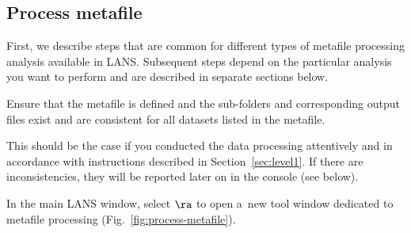
\subsection{Process metafile}
\setcounter{step}{0}

First, we describe steps that are common for different types of metafile processing analysis available in LANS. Subsequent steps depend on the particular analysis you want to perform and are described in separate sections below.

\s Ensure that the metafile is defined and the sub-folders and corresponding output files exist and are consistent for all datasets listed in the metafile.

\bul This should be the case if you conducted the data processing attentively and in accordance with instructions described in Section~\ref{sec:level1}. If there are inconsistencies, they will be reported later on in the console (see below).

\s In the main LANS window, select  $\ra$  to open a~new tool window dedicated to metafile processing (Fig.~\ref{fig:process-metafile}).

